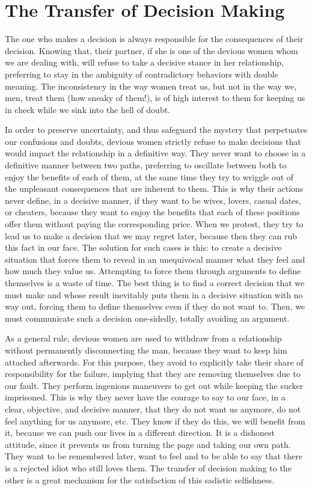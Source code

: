 \section{The Transfer of Decision Making}

\par The one who makes a decision is always responsible for the consequences of their decision. Knowing that, their partner, if she is one of the devious women whom we are dealing with, will refuse to take a decisive stance in her relationship, preferring to stay in the ambiguity of contradictory behaviors with double meaning. The inconsistency in the way women treat us, but not in the way we, men, treat them (how sneaky of them!), is of high interest to them for keeping us in check while we sink into the hell of doubt.

\par In order to preserve uncertainty, and thus safeguard the mystery that perpetuates our confusions and doubts, devious women strictly refuse to make decisions that would impact the relationship in a definitive way. They never want to choose in a definitive manner between two paths, preferring to oscillate between both to enjoy the benefits of each of them, at the same time they try to wriggle out of the unpleasant consequences that are inherent to them. This is why their actions never define, in a decisive manner, if they want to be wives, lovers, casual dates, or cheaters, because they want to enjoy the benefits that each of these positions offer them without paying the corresponding price. When we protest, they try to lead us to make a decision that we may regret later, because then they can rub this fact in our face. The solution for such cases is this: to create a decisive situation that forces them to reveal in an unequivocal manner what they feel and how much they value us. Attempting to force them through arguments to define themselves is a waste of time. The best thing is to find a correct decision that we must make and whose result inevitably puts them in a decisive situation with no way out, forcing them to define themselves even if they do not want to. Then, we must communicate such a decision one-sidedly, totally avoiding an argument.

\par As a general rule, devious women are used to withdraw from a relationship without permanently disconnecting the man, because they want to keep him attached afterwards. For this purpose, they avoid to explicitly take their share of responsibility for the failure, implying that they are removing themselves due to our fault. They perform ingenious maneuvers to get out while keeping the sucker imprisoned. This is why they never have the courage to say to our face, in a clear, objective, and decisive manner, that they do not want us anymore, do not feel anything for us anymore, etc. They know if they do this, we will benefit from it, because we can push our lives in a different direction. It is a dishonest attitude, since it prevents us from turning the page and taking our own path. They want to be remembered later, want to feel and to be able to say that there is a rejected idiot who still loves them. The transfer of decision making to the other is a great mechanism for the satisfaction of this sadistic selfishness.